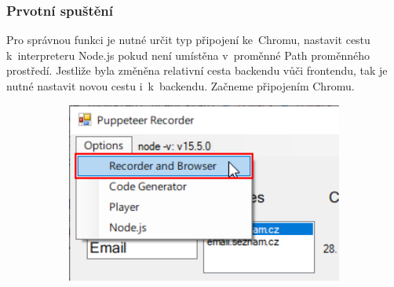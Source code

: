 \documentclass[12pt, a4paper, twoside]{article}
\begin{document}
	\subsubsection{Prvotní spuštění}
	\label{subsub_sec:firstRun}
	
	Pro správnou funkci je nutné určit typ připojení ke~Chromu, nastavit cestu k~interpreteru Node.js pokud není umístěna v~proměnné Path proměnného prostředí. Jestliže byla změněna relativní cesta backendu vůči frontendu, tak je nutné nastavit novou cestu i~k~backendu. Začneme připojením Chromu.
	\begin{figure}[H]
		\centering
		\begin{minipage}{0.49\textwidth}
			\begin{subfigure}[t]{1.0\textwidth}
				\includegraphics[width=1.0\textwidth]{recorderSettingsMenuItem.png}
			\end{subfigure}	
		\end{minipage}
		\hfill
		\textrightarrow
		\hfill
		\begin{minipage}{0.45\textwidth}
			\begin{subfigure}[t]{1.0\textwidth}

\end{subfigure}
\end{minipage}
\end{figure}
\end{document}
